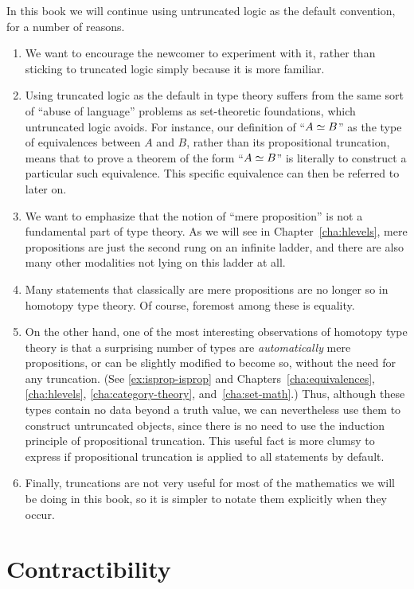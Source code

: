 In this book we will continue using untruncated logic as the default convention, for a number of reasons.
\begin{enumerate}[label=(\arabic*)]
\item We want to encourage the newcomer to experiment with it, rather than sticking to truncated logic simply because it is more familiar.
\item Using truncated logic as the default in type theory suffers from the same sort of ``abuse of language'' problems as set-theoretic foundations, which untruncated logic avoids.
  For instance, our definition of ``$A \simeq B$'' as the type of equivalences between $A$ and $B$, rather than its propositional truncation, means that to prove a theorem of the form ``$A \simeq B$'' is literally to construct a particular such equivalence.
  This specific equivalence can then be referred to later on.
\item We want to emphasize that the notion of ``mere proposition'' is not a fundamental part of type theory.
  As we will see in Chapter~\ref{cha:hlevels}, mere propositions are just the second rung on an infinite ladder, and there are also many other modalities not lying on this ladder at all.
\item Many statements that classically are mere propositions are no longer so in homotopy type theory.
  Of course, foremost among these is equality.
\item On the other hand, one of the most interesting observations of homotopy type theory is that a surprising number of types are \emph{automatically} mere propositions, or can be slightly modified to become so, without the need for any truncation.
  (See \autoref{ex:isprop-isprop} and Chapters~\ref{cha:equivalences}, \ref{cha:hlevels}, \ref{cha:category-theory}, and~\ref{cha:set-math}.)
  Thus, although these types contain no data beyond a truth value, we can nevertheless use them to construct untruncated objects, since there is no need to use the induction principle of propositional truncation.
  This useful fact is more clumsy to express if propositional truncation is applied to all statements by default.
\item Finally, truncations are not very useful for most of the mathematics we will be doing in this book, so it is simpler to notate them explicitly when they occur.
\end{enumerate}

\section{Contractibility}
\label{sec:contractibility}

